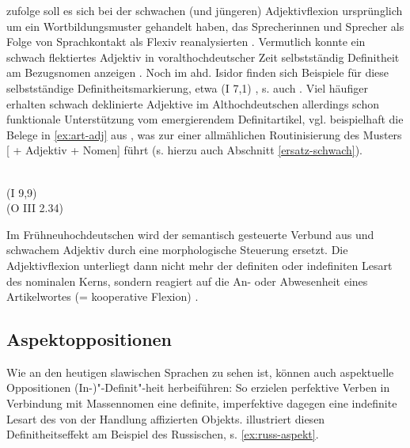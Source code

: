 \textcite[361ff.]{Braunmuller2008} zufolge soll es sich bei der schwachen (und jüngeren) Adjektivflexion ursprünglich um ein Wortbildungsmuster gehandelt haben, das Sprecherinnen und Sprecher als Folge von Sprachkontakt als Flexiv reanalysierten \parencite[zu alternativen Entstehungsszenarien s.][13-26]{Kovari1984}. Vermutlich konnte ein schwach flektiertes Adjektiv in voralthochdeutscher Zeit selbstständig Definitheit am Bezugsnomen anzeigen 
\parencites()()[69]{Demske2001}[364]{Braunmuller2008}. Noch im ahd. Isidor finden sich Beispiele für diese selbstständige Definitheitsmarkierung, etwa   (I 7,1) \parencite[226]{Braune2004}, s. auch \textcite[69f.]{Demske2001}. 
Viel häufiger erhalten schwach deklinierte Adjektive im Althochdeutschen allerdings schon funktionale Unterstützung vom emergierendem Definitartikel, vgl. beispielhaft die Belege in \ref{ex:art-adj} aus \textcite[24,28]{Schrodt2004}, was zur einer allmählichen Routinisierung des Musters [ + Adjektiv + Nomen] führt (s. hierzu auch Abschnitt \ref{ersatz-schwach}).

\begin{exe}
	\ex \label{ex:art-adj}   
	\begin{xlist}
		\ex \label{ex:art-adj1}  \\    (I 9,9) 
		\ex \label{ex:art-adj2}   \\  (O III 2.34)
		\end{xlist}
\end{exe}
 
Im Frühneuhochdeutschen wird der semantisch gesteuerte Verbund aus  und schwachem Adjektiv durch eine morphologische Steuerung ersetzt. Die Adjektivflexion unterliegt dann nicht mehr der definiten oder indefiniten Lesart des nominalen Kerns, sondern reagiert auf die An- oder Abwesenheit eines Artikelwortes (= kooperative Flexion) \parencite[s. hierzu ausführlich][]{Demske2001,Szczepaniak2011a}. 

\subsection{Aspektoppositionen} \label{sec:aspektoppo}

Wie an den heutigen slawischen Sprachen zu sehen ist, können auch aspektuelle Oppositionen (In-)"-Definit"-heit herbeiführen: So erzielen perfektive Verben in Verbindung mit Massennomen eine definite, imperfektive dagegen eine indefinite Lesart des von der Handlung affizierten Objekts. \textcite[11ff.]{Leiss2000} illustriert diesen Definitheitseffekt am Beispiel des Russischen, s. \ref{ex:russ-aspekt}.  

